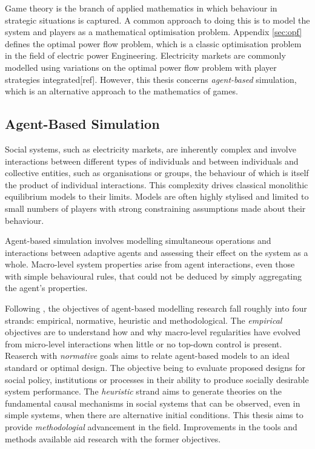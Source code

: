 Game theory is the branch of applied mathematics in which behaviour in
strategic situations is captured.  A common approach to doing this is to
model the system and players as a mathematical optimisation problem.  Appendix
\ref{sec:opf} defines the optimal power flow problem, which is a classic
optimisation problem in the field of electric power Engineering.  Electricity
markets are commonly modelled using variations on the optimal power flow problem with
player strategies integrated[ref].  However, this thesis concerns
\textit{agent-based} simulation, which is an alternative approach to the mathematics of games.

\subsection{Agent-Based Simulation}
Social systems, such as electricity markets, are inherently complex and involve
interactions between different types of individuals and between individuals
and collective entities, such as organisations or groups, the behaviour of which
is itself the product of individual interactions.  This complexity
drives classical monolithic equilibrium models to their limits.  Models are
often highly stylised and limited to small numbers of players with strong
constraining assumptions made about their behaviour.

Agent-based simulation involves modelling simultaneous operations and
interactions between adaptive agents and assessing their effect on the system
as a whole.  Macro-level system properties arise from agent interactions, even
those with simple behavioural rules, that could not be deduced by simply
aggregating the agent's properties. %

Following \cite{tesfatsi:handbook}, the objectives of agent-based modelling
research fall roughly into four strands: empirical, normative, heuristic and
methodological. The \textit{empirical} objectives are to understand how and why macro-level
regularities have evolved from micro-level interactions when little or no
top-down control is present.  Reaserch with \textit{normative} goals aims to
relate agent-based models to an ideal standard or optimal design.  The objective being
to evaluate proposed designs for social policy, institutions or processes in
their ability to produce socially desirable system performance.  The
\textit{heuristic} strand aims to generate theories on the fundamental causal
mechanisms in social systems that can be observed, even in simple systems, when there are
alternative initial conditions.  This thesis aims to provide
\textit{methodologial} advancement in the field.  Improvements in the tools
and methods available aid research with the former objectives.

